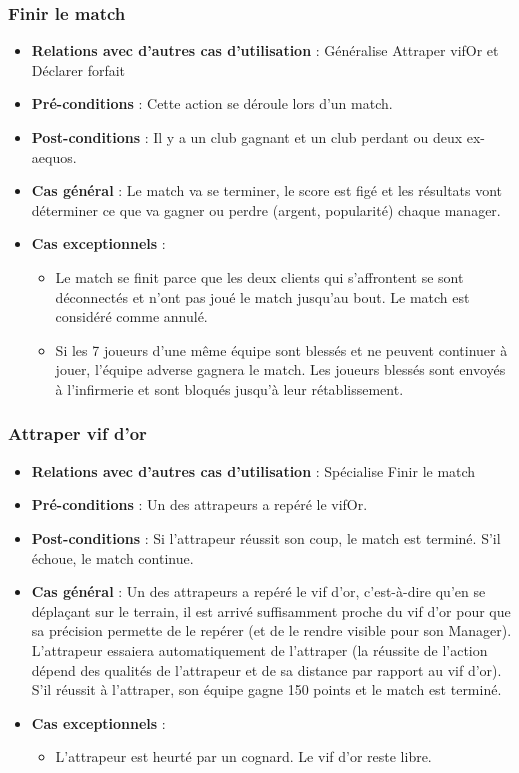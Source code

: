 \documentclass[a4paper,titlepage]{scrreprt}
\begin{document}
    \subsubsection{Finir le match}
      \begin{itemize}
        \item \textbf{Relations avec d'autres cas d'utilisation}  : Généralise Attraper \gls{vifOr} et Déclarer forfait
        \item \textbf{Pré-conditions} : Cette action se déroule lors d'un match.
        \item \textbf{Post-conditions} : Il y a un club gagnant et un club perdant ou deux ex-aequos.
        \item \textbf{Cas général} : Le match va se terminer, le score est figé et les résultats vont déterminer ce que va gagner ou perdre (argent, popularité) chaque manager.
        \item \textbf{Cas exceptionnels} :
          \begin{itemize}
            \item Le match se finit parce que les deux clients qui s’affrontent se sont déconnectés et n’ont pas joué le match jusqu’au bout. Le match est considéré comme annulé.
            \item Si les 7 joueurs d'une même équipe sont blessés et ne peuvent continuer à jouer, l'équipe adverse gagnera le match. Les joueurs blessés sont envoyés à l'infirmerie et sont bloqués jusqu'à leur rétablissement.
          \end{itemize}
      \end{itemize}
    \subsubsection{Attraper vif d'or}
      \begin{itemize}
        \item \textbf{Relations avec d'autres cas d'utilisation}  : Spécialise Finir le match
        \item \textbf{Pré-conditions} : Un des \gls{attrapeur}s  a repéré le \gls{vifOr}.
        \item \textbf{Post-conditions} : Si l'attrapeur réussit son coup, le match est terminé. S'il échoue, le match continue.
        \item \textbf{Cas général} : Un des attrapeurs a repéré le vif d’or, c’est-à-dire qu’en se déplaçant sur le terrain, il est arrivé suffisamment proche du vif d’or pour que sa précision permette de le repérer (et de le rendre visible pour son Manager). L’attrapeur essaiera automatiquement de l’attraper (la réussite de l’action dépend des qualités de l’attrapeur et de sa distance par rapport au vif d’or). S’il réussit à l’attraper, son équipe gagne 150 points et le match est terminé.
        \item \textbf{Cas exceptionnels} :
         \begin{itemize}
            \item L'attrapeur est heurté par un cognard. Le vif d'or reste libre.
            \end{itemize}
      \end{itemize}
\end{document}
